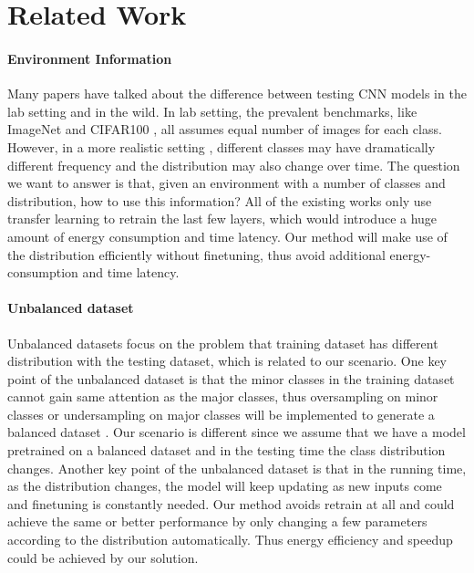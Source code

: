 \documentclass[pageno]{jpaper}
\begin{document}
\section{Related Work} \label{relatedWork}
\paragraph{Environment Information}

Many papers have talked about the difference between testing CNN models in the lab setting and in the wild. In lab setting, the prevalent benchmarks, like ImageNet \cite{deng2009imagenet} and CIFAR100 \cite{krizhevsky2009learning}, all assumes equal number of images for each class. However, in a more realistic setting \cite{han2016mcdnn, shen2016fast}, different classes may have dramatically different frequency and the distribution may also change over time. The question we want to answer is that, given an environment with a number of classes and distribution, how to use this information? All of the existing works \cite{han2016mcdnn, shen2016fast} only use transfer learning to retrain the last few layers, which would introduce a huge amount of energy consumption and time latency. Our method will make use of the distribution efficiently without finetuning, thus avoid additional energy-consumption and time latency.

\paragraph{Unbalanced dataset}
Unbalanced datasets focus on the problem that training dataset has different distribution with the testing dataset, which is related to our scenario. One key point of the unbalanced dataset is that the minor classes in the training dataset cannot gain same attention as the major classes, thus oversampling on minor classes or undersampling on major classes will be implemented to generate a balanced dataset \cite{hoens2012learning, van2007experimental, wang2016dealing}. Our scenario is different since we assume that we have a model pretrained on a balanced dataset and in the testing time the class distribution changes. Another key point of the unbalanced dataset is that in the running time, as the distribution changes, the model will keep updating as new inputs come and finetuning is constantly needed. Our method avoids retrain at all and could achieve the same or better performance by only changing a few parameters according to the distribution automatically. Thus energy efficiency and speedup could be achieved by our solution.
\end{document}
